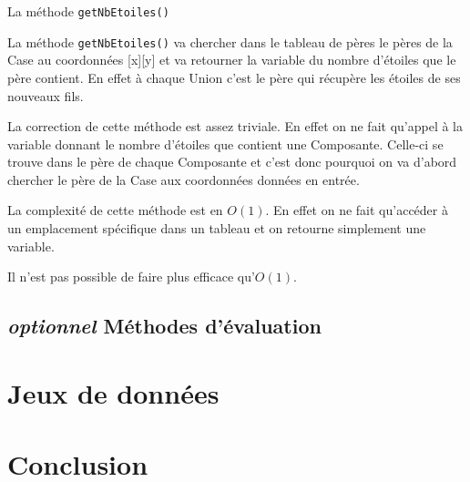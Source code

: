 \documentclass{article}
\newcommand{\info}{\texttt}
\begin{document}
                \begin{algorithm}[H]
                \caption{La méthode \info{getNbEtoiles()}}
                \end{algorithm}
                
                La méthode \info{getNbEtoiles()} va chercher dans le tableau de pères le pères de la Case au coordonnées [x][y] et va retourner la variable du nombre d'étoiles que le père contient. En effet à chaque Union c'est le père qui récupère les étoiles de ses nouveaux fils.
                
                La correction de cette méthode est assez triviale. En effet on ne fait qu'appel à la variable donnant le nombre d'étoiles que contient une Composante. Celle-ci se trouve dans le père de chaque Composante et c'est donc pourquoi on va d'abord chercher le père de la Case aux coordonnées données en entrée.
                
                La complexité de cette méthode est en $O(1)$. En effet on ne fait qu'accéder à un emplacement spécifique dans un tableau et on retourne simplement une variable.
                
                Il n'est pas possible de faire plus efficace qu'$O(1)$.

    \subsection{\emph{optionnel} Méthodes d'évaluation}

\section{Jeux de données}

\section{Conclusion}
\end{document}
